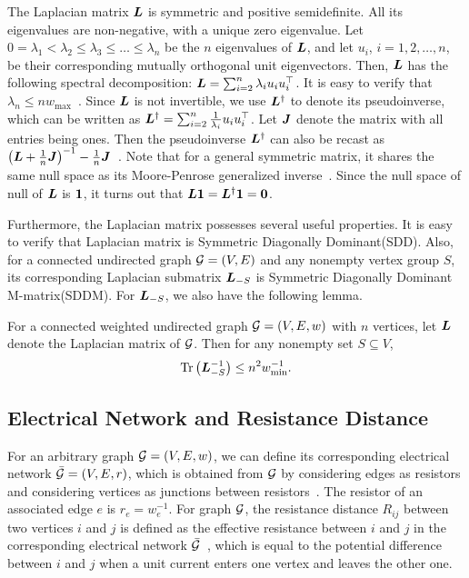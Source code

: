 \documentclass[journal]{IEEEtran}
\begin{document}
The Laplacian matrix \(\boldsymbol{L}\) is symmetric and positive semidefinite. All  its eigenvalues  are non-negative, with a unique zero eigenvalue. Let \(0=\lambda_1< \lambda_2 \leq \lambda_3\leq \dots\leq \lambda_{n}\) be the \(n\) eigenvalues of  \(\boldsymbol{L}\), and let \(u_i\), \( i={1,2,\dots,n}\), be their corresponding mutually orthogonal  unit eigenvectors. Then, \(\boldsymbol{L}\) has the following spectral decomposition:  \(\boldsymbol{L}=\sum_{i=2}^{n}\lambda_i u_iu_i^\top\).  It is easy to verify that \( \lambda_{n}\leq n w_{\max}\)~\cite{LiSc18}.
Since \(\boldsymbol{L}\) is not invertible, we use \(\boldsymbol{L}^{\dagger}\) to denote its pseudoinverse, which can be written as \(\boldsymbol{L}^{\dagger}=\sum_{i=2}^{n}\frac{1}{\lambda_i}u_iu_i^{\top}\). Let \(\boldsymbol{J}\) denote the matrix with all entries being ones. Then the pseudoinverse \(\boldsymbol{L}^{\dagger}\) can also be recast as \(\left( \boldsymbol{L} +\frac{1}{n}\boldsymbol{J} \right)^{-1} - \frac{1}{n}\boldsymbol{J}\)~\cite{GhBoSa08}. Note that for a general symmetric matrix, it shares the same null space as its Moore-Penrose generalized inverse~\cite{BeGrTh74}.
Since the  null space of  null of \({\boldsymbol{L}}\) is \( \boldsymbol{1}\),  it turns out that \({\boldsymbol{L}} \boldsymbol{1} ={\boldsymbol{L}}^{\dagger} \boldsymbol{1} =\mathbf{0}\).

Furthermore, the Laplacian matrix possesses several useful properties.
It is easy to verify that Laplacian matrix is Symmetric Diagonally Dominant(SDD).
Also, for a connected undirected graph \(\mathcal{G}=(V,E)\) and any nonempty vertex group \(S\), its corresponding Laplacian submatrix \(\boldsymbol{L}_{-S}\) is Symmetric Diagonally Dominant M-matrix(SDDM).
For \(\boldsymbol{L}_{-S}\), we also have the following lemma.
\begin{lemma}\label{lem:trace-lap}
    For a connected weighted undirected graph \(\mathcal{G}=(V,E,w)\) with \(n\) vertices, let \(\boldsymbol{L}\) denote the Laplacian matrix of \(\mathcal{G}\).
    Then for any nonempty set \(S\subseteq V\),
    \begin{equation*}
        \mathrm{Tr}\left(\boldsymbol{L}_{-S}^{-1}\right)\le n^2w_{\min}^{-1}.
    \end{equation*}
\end{lemma}

\subsection{Electrical Network and Resistance Distance}

For an arbitrary graph \(\mathcal{G}=(V,E,w)\), we can define its corresponding electrical network \(\bar{\mathcal{G}}=(V,E,r)\), which is obtained from \(\mathcal{G}\)  by considering edges as resistors and considering vertices as junctions between resistors~\cite{DoSn84}. The resistor of an associated  edge \(e\) is \(r_e=w_e^{-1}\).  For graph  \(\mathcal{G}\), the resistance distance \(R_{ij}\) between two vertices \(i\) and \(j\)  is defined as the effective resistance between \(i\) and \(j\) in the corresponding  electrical network \(\bar{\mathcal{G}}\)~\cite{KlRa93}, which is equal to the potential difference between \(i\) and \(j\) when a unit current enters one vertex and leaves the other one.
\end{document}
